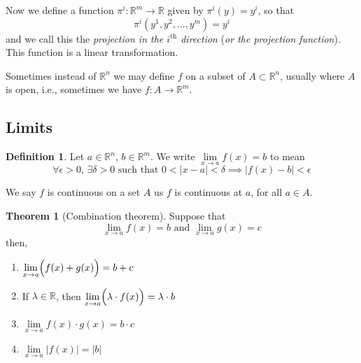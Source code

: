 \documentclass[a4paper,14pt]{extarticle}
\theoremstyle{definition}
\newtheorem*{theorem}{Theorem}
\newtheorem*{definition}{Definition}
\begin{document}
\noindent Now we define a function $\pi^i:\mathbb{R}^m\rightarrow\mathbb{R}$ given by $\pi^i(y)=y^i$, so that
\[\pi^i(y^1,y^2,\ldots,y^m)=y^i\] and we call this the \emph{projection in the $i^{\text{th}}$ direction} (\emph{or the projection function}). This function is a linear transformation.

\begin{center}
\end{center}

Sometimes instead of $\mathbb{R}^n$ we may define $f$ on a subset of $A\subset\mathbb{R}^n$, usually where $A$ is open, i.e., sometimes we have
$f:A\rightarrow\mathbb{R}^m$.

\subsection{Limits}
\begin{definition}
	Let $a\in\mathbb{R}^n, \,b\in\mathbb{R}^m$. We write $\lim\limits_{x\to a} f(x)=b$ to mean
	\[\forall\epsilon>0, \,\exists\delta>0\text{ such that } 0<|x-a|<\delta\implies|f(x)-b|<\epsilon\]
\end{definition}

We say $f$ is continuous on a set $A$ us $f$ is continuous at $a$, for all $a\in A$.

\begin{theorem}[Combination theorem]
	Suppose that \[\lim\limits_{x\to a} f(x)=b\text{ and }\lim\limits_{x\to a} g(x)=c\] then,
	\begin{enumerate}
		\item $\lim\limits_{x\to a} \Bigl(f(x)+g(x)\Bigr)=b+c$
		\item If $\lambda\in\mathbb{R}$, then $\lim\limits_{x\to a} \Bigl(\lambda\cdot f(x)\Bigr)=\lambda\cdot b$
		\item $\lim\limits_{x\to a} f(x)\cdot g(x)=b\cdot c$
		\item $\lim\limits_{x\to a} |f(x)|=|b|$
	\end{enumerate}
\end{theorem}
\end{document}
